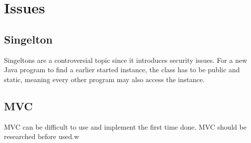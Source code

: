 \chapter{Issues}
\section{Singelton}
	Singeltons are a controversial topic since it introduces security issues. For a new Java program to find a earlier started instance, the class has to be public and static, meaning every other program may also access the instance. 

\section{MVC}
	MVC can be difficult to use and implement the first time done. MVC should be researched before used.w